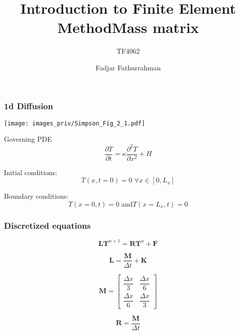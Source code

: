 



\title{Introduction to Finite Element Method}
\subtitle{TF4062}
\author{Fadjar Fathurrahman}
\date{}


\frame{\titlepage}


\begin{frame} %
\frametitle{1d Diffusion}

{\centering
\texttt{[image: images\_priv/Simpson\_Fig\_2\_1.pdf]}
\par}

Governing PDE
\begin{equation*}
\frac{\partial T}{\partial t} = \kappa \frac{\partial^2 T}{\partial x^2} + H
\end{equation*}

Initial conditions:
\begin{equation*}
T(x,t=0) = 0 \,\, \forall x \in [0,L_{x}]
\end{equation*}

Boundary conditions:
\begin{equation*}
T(x=0,t) = 0 \,\,\text{and} T(x=L_{x},t) = 0
\end{equation*}

\end{frame} %



\begin{frame} %
\frametitle{Discretized equations}

\begin{equation*}
\mathbf{L} \mathbf{T}^{n+1} = \mathbf{R} \mathbf{T}^{n} + \mathbf{F}
\end{equation*}

\begin{equation*}
\mathbf{L} = \frac{\mathbf{M}}{\Delta t} + \mathbf{K}
\end{equation*}

\end{frame}


\begin{frame} %
\title{Mass matrix}

\begin{equation*}
\mathbf{M} = \begin{bmatrix}
\dfrac{\Delta x}{3} & \dfrac{\Delta x}{6} \\
\dfrac{\Delta x}{6} & \dfrac{\Delta x}{3}
\end{bmatrix}
\end{equation*}

\begin{equation*}
\mathbf{R} = \frac{\mathbf{M}}{\Delta t}
\end{equation*}

\end{frame}



